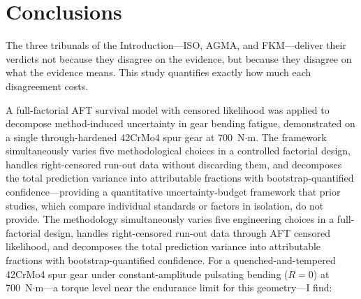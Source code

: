 \documentclass[twocolumn,12pt,a4paper]{article}
\begin{document}
\section{Conclusions}
\label{sec:conclusions}

The three tribunals of the Introduction---ISO, AGMA, and FKM---deliver
their verdicts not because they disagree on the evidence, but because
they disagree on what the evidence means. This study quantifies exactly
how much each disagreement costs.

A full-factorial AFT survival model with censored likelihood was applied
to decompose method-induced uncertainty in gear bending fatigue,
demonstrated on a single through-hardened 42CrMo4 spur gear at
700~N$\cdot$m. The framework simultaneously varies five methodological
choices in a controlled factorial design, handles right-censored run-out
data without discarding them, and decomposes the total prediction
variance into attributable fractions with bootstrap-quantified
confidence---providing a quantitative uncertainty-budget framework that
prior studies, which compare individual standards or factors in isolation,
do not provide.
The methodology
simultaneously varies five engineering choices in a full-factorial
design, handles right-censored run-out data through AFT censored
likelihood, and decomposes the total prediction variance into
attributable fractions with bootstrap-quantified confidence. For a
quenched-and-tempered 42CrMo4 spur gear under constant-amplitude
pulsating bending ($R=0$) at 700~N$\cdot$m---a torque level near the
endurance limit for this geometry---I find:
\end{document}
